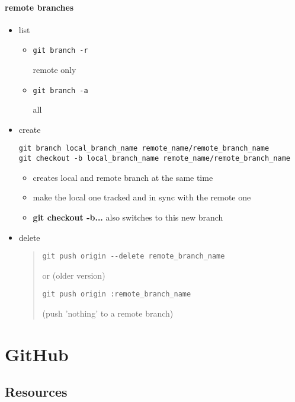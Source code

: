 \documentclass{report}
\begin{document}
\subsection{remote branches}
\begin{itemize}
\item list
\begin{itemize}

\item \begin{verbatim}
git branch -r
\end{verbatim}
remote only

\item \begin{verbatim}
git branch -a
\end{verbatim}
 all
\end{itemize}

\item create
\begin{verbatim}
git branch local_branch_name remote_name/remote_branch_name
git checkout -b local_branch_name remote_name/remote_branch_name
\end{verbatim}
\begin{itemize}
\item creates local and remote branch at the same time
\item make the local one tracked and in sync with the remote one
\item \textbf{git checkout -b...} also switches to this new branch 
\end{itemize}

\item delete
\begin{quote}
\begin{verbatim}
git push origin --delete remote_branch_name
\end{verbatim}
or (older version)
\begin{verbatim}
git push origin :remote_branch_name
\end{verbatim}
(push 'nothing' to a remote branch)
\end{quote}

\end{itemize}



\part{GitHub}


\chapter{Resources}
\end{document}
